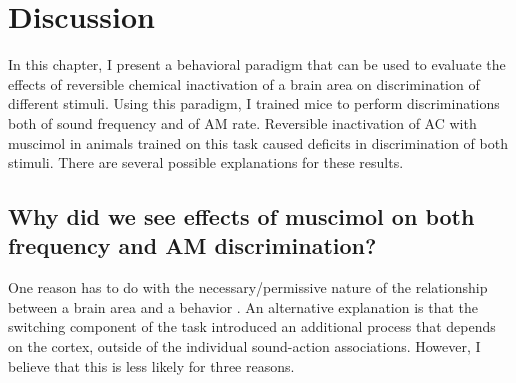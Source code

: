 \section{Discussion}

In this chapter, I present a behavioral paradigm that can be used to evaluate
the effects of reversible chemical inactivation of a brain area on
discrimination of different stimuli. 
%
Using this paradigm, I trained mice to perform discriminations both of sound
frequency and of AM rate.
%
Reversible inactivation of AC with muscimol in animals trained on this task
caused deficits in discrimination of both stimuli. 
%
There are several possible explanations for these results. 

\subsection{Why did we see effects of muscimol on both frequency and AM
discrimination?}

One reason has to do with the necessary/permissive nature of the relationship
between a brain area and a behavior \citep{Otchy2015}.
An alternative explanation is that the switching component of the task
introduced an additional process that depends on the cortex, outside of the
individual sound-action associations. 
However, I believe that this is less likely for three reasons.

